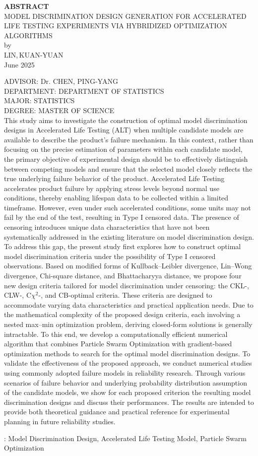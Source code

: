 \begin{center}{\Large \bf ABSTRACT}\\[20pt]
    {\large MODEL DISCRIMINATION DESIGN GENERATION FOR ACCELERATED LIFE TESTING EXPERIMENTS VIA HYBRIDIZED OPTIMIZATION ALGORITHMS}\\[10pt]
    by\\[10pt] LIN,\,KUAN-YUAN\\[10pt] June 2025
\end{center}
{\small ADVISOR: Dr. CHEN, PING-YANG  \\[5pt]
        DEPARTMENT: DEPARTMENT OF STATISTICS\\[5pt]
        MAJOR: STATISTICS\\[5pt]
        DEGREE: MASTER OF SCIENCE}\\[10pt]
\noindent
This study aims to investigate the construction of optimal model discrimination designs in Accelerated Life Testing (ALT) when multiple candidate models are available to describe the product's failure mechanism. In this context, rather than focusing on the precise estimation of parameters within each candidate model, the primary objective of experimental design should be to effectively distinguish between competing models and ensure that the selected model closely reflects the true underlying failure behavior of the product. Accelerated Life Testing accelerates product failure by applying stress levels beyond normal use conditions, thereby enabling lifespan data to be collected within a limited timeframe. However, even under such accelerated conditions, some units may not fail by the end of the test, resulting in Type I censored data. The presence of censoring introduces unique data characteristics that have not been systematically addressed in the existing literature on model discrimination design. To address this gap, the present study first explores how to construct optimal model discrimination criteria under the possibility of Type I censored observations. Based on modified forms of Kullback–Leibler divergence, Lin–Wong divergence, Chi-square distance, and Bhattacharyya distance, we propose four new design criteria tailored for model discrimination under censoring: the CKL-, CLW-, C$\chi^2$-, and CB-optimal criteria. These criteria are designed to accommodate varying data characteristics and practical application needs. Due to the mathematical complexity of the proposed design criteria, each involving a nested max–min optimization problem, deriving closed-form solutions is generally intractable. To this end, we develop a computationally efficient numerical algorithm that combines Particle Swarm Optimization with gradient-based optimization methods to search for the optimal model discrimination designs. To validate the effectiveness of the proposed approach, we conduct numerical studies using commonly adopted failure models in reliability research. Through various scenarios of failure behavior and underlying probability distribution assumption of the candidate models, we show for each proposed criterion the resulting model discrimination designs and discuss their performances. The results are intended to provide both theoretical guidance and practical reference for experimental planning in future reliability studies.

\vspace*{2cm}
: Model Discrimination Design, Accelerated Life Testing Model, Particle Swarm Optimization


